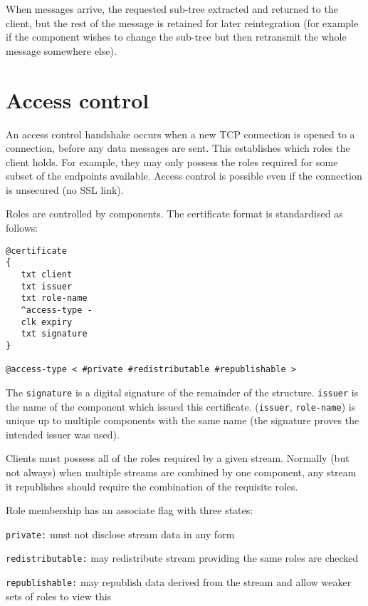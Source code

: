 \documentclass[12pt,a4paper,twoside]{article}
\renewcommand{\_}{\texttt{\symbol{95}}}
\begin{document}
When messages arrive, the requested sub-tree extracted and
returned to the client, but the rest of the message is retained
for later reintegration (for example if the component wishes to
change the sub-tree but then retransmit the whole message somewhere
else).

\section{Access control}

An access control handshake occurs when a new TCP connection is
opened to a connection, before any data messages are sent.
This establishes which roles the client holds. For example,
they may only possess the roles required for some subset of the endpoints
available.
Access control is possible even if the connection is unsecured (no
SSL link).

Roles are controlled by components.
The certificate format is standardised as follows:

\begin{verbatim}
@certificate
{
   txt client
   txt issuer
   txt role-name
   ^access-type -
   clk expiry
   txt signature
}

@access-type < #private #redistributable #republishable >
\end{verbatim}

The \verb^signature^ is a digital signature of the remainder of the
structure. \verb^issuer^ is the name of the component which issued
this certificate. (\verb^issuer^, \verb^role-name^) is unique
up to multiple components with the same name (the signature
proves the intended issuer was used).

Clients must possess all of the roles required by a given stream.
Normally (but not always) when multiple streams are combined by one
component, any stream it republishes should require the combination
of the requisite roles.

Role membership has an associate flag with three states:
\begin{bulletlist}
\item \texttt{private:} must not disclose stream data in any form
\item \texttt{redistributable:} may redistribute stream providing the same
	roles are checked
\item \texttt{republishable:} may republish data derived from the stream
	and allow weaker sets of roles to view this
\end{bulletlist}
\end{document}
